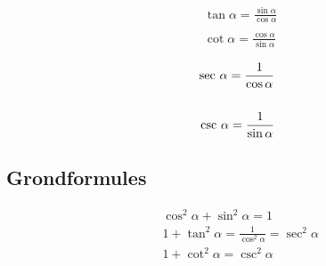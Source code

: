 \documentclass[a4paper,12pt]{article}
\begin{document}
\begin{minipage}[b]{0.5\linewidth}
\begin{eqnarray*}
&&\tan \alpha = \frac{\sin \alpha}{\cos \alpha}\\
&&\\
&&\cot \alpha = \frac{\cos \alpha}{\sin \alpha}
\end{eqnarray*}
\end{minipage}
\hspace{0.5cm}
\begin{minipage}[b]{0.5\linewidth}
\begin{eqnarray*}
&&\textup{sec }\alpha = \frac{1}{\cos \alpha}\\
&&\\
&&\textup{csc }\alpha = \frac{1}{\sin \alpha}
\end{eqnarray*}
\end{minipage}

\subsection{Grondformules}

\begin{minipage}[b]{0.5\linewidth}
\begin{eqnarray*}
&&\cos^2\alpha +\sin^2 \alpha =1\\
&&1+\tan^2\alpha= \frac{1}{\cos^2 \alpha} = \sec^2 \alpha\\
&&1+\cot^2\alpha = \csc^2 \alpha
\end{eqnarray*}
\end{minipage}
\end{document}
